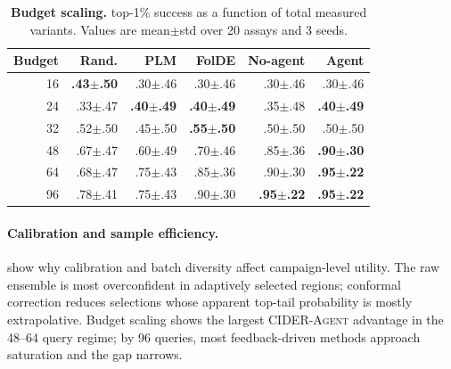 \documentclass{article}
\newcommand{\agent}{\textsc{CIDER-Agent}}
\newcommand{\topone}{top-1\%}
\begin{document}
\begin{table}[t]
\caption{\textbf{Budget scaling.} \topone{} success as a function of total measured variants. Values are mean$\pm$std over 20 assays and 3 seeds.}
\label{tab:budget}
\centering
\scriptsize
\setlength{\tabcolsep}{3pt}
\begin{tabular}{rrrrrr}
\toprule
Budget & Rand. & PLM & FolDE & No-agent & Agent \\
\midrule
16 & \textbf{.43$\pm$.50} & \cellcolor{gray!20}.30$\pm$.46 & \cellcolor{gray!20}.30$\pm$.46 & \cellcolor{gray!20}.30$\pm$.46 & \cellcolor{gray!20}.30$\pm$.46 \\
24 & .33$\pm$.47 & \textbf{.40$\pm$.49} & \textbf{.40$\pm$.49} & \cellcolor{gray!20}.35$\pm$.48 & \textbf{.40$\pm$.49} \\
32 & \cellcolor{gray!20}.52$\pm$.50 & .45$\pm$.50 & \textbf{.55$\pm$.50} & .50$\pm$.50 & .50$\pm$.50 \\
48 & .67$\pm$.47 & .60$\pm$.49 & .70$\pm$.46 & \cellcolor{gray!20}.85$\pm$.36 & \textbf{.90$\pm$.30} \\
64 & .68$\pm$.47 & .75$\pm$.43 & .85$\pm$.36 & \cellcolor{gray!20}.90$\pm$.30 & \textbf{.95$\pm$.22} \\
96 & .78$\pm$.41 & .75$\pm$.43 & \cellcolor{gray!20}.90$\pm$.30 & \textbf{.95$\pm$.22} & \textbf{.95$\pm$.22} \\
\bottomrule
\end{tabular}
\end{table}

\paragraph{Calibration and sample efficiency.}  show why calibration and batch diversity affect campaign-level utility. The raw ensemble is most overconfident in adaptively selected regions; conformal correction reduces selections whose apparent top-tail probability is mostly extrapolative. Budget scaling shows the largest \agent{} advantage in the 48--64 query regime; by 96 queries, most feedback-driven methods approach saturation and the gap narrows.
\end{document}
